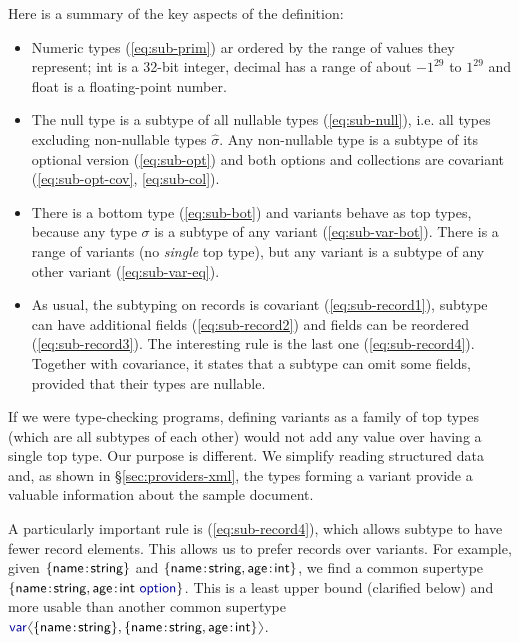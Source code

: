 \documentclass[10pt,preprint,clearpagebib]{sigplanconf}
\newcommand{\langl}{\begin{picture}(4.5,7)
\put(1.1,2.5){\rotatebox{60}{\line(1,0){5.5}}}
\put(1.1,2.5){\rotatebox{300}{\line(1,0){5.5}}}
\end{picture}}
\newcommand{\rangl}{\begin{picture}(4.5,7)
\put(.9,2.5){\rotatebox{120}{\line(1,0){5.5}}}
\put(.9,2.5){\rotatebox{240}{\line(1,0){5.5}}}
\end{picture}}
\newcommand{\kvd}[1]{\textnormal{\textcolor{kvdclr}{\sffamily #1}}}
\newcommand{\ident}[1]{\textnormal{\sffamily #1}}
\begin{document}

\noindent
Here is a summary of the key aspects of the definition:
\begin{itemize}
\item Numeric types (\ref{eq:sub-prim}) ar ordered by the range of values they represent;
  \ident{int} is a 32-bit integer, \ident{decimal} has a range of about $-1^{29}$ to $1^{29}$ and 
  \ident{float} is a floating-point number.

\item The \kvd{null} type is a subtype of all nullable types (\ref{eq:sub-null}), i.e. all 
  types excluding non-nullable types $\hat{\sigma}$. Any non-nullable type is a 
  subtype of its optional version (\ref{eq:sub-opt}) and both options and collections are 
  covariant (\ref{eq:sub-opt-cov}, \ref{eq:sub-col}).

\item There is a bottom type (\ref{eq:sub-bot}) and variants behave as top types, because
  any type $\sigma$ is a subtype of any variant (\ref{eq:sub-var-bot}). There is a range of
  variants (no \emph{single} top type), but any variant is a subtype of any other variant 
  (\ref{eq:sub-var-eq}).

\item As usual, the subtyping on records is covariant (\ref{eq:sub-record1}), subtype can have additional 
  fields (\ref{eq:sub-record2}) and fields can  be reordered (\ref{eq:sub-record3}). The interesting rule 
  is the last one (\ref{eq:sub-record4}).  Together with covariance, it states that a subtype can omit some 
  fields, provided that their types are nullable.
\end{itemize}

\noindent
If we were type-checking programs, defining variants as a family of top types (which are all 
subtypes of each other) would not add any value over having a single top type. Our purpose 
is different. We simplify reading structured data and, as shown in \S\ref{sec:providers-xml}, 
the types forming a variant provide a valuable information about the sample document.

A particularly important rule is (\ref{eq:sub-record4}), which allows subtype to have fewer record 
elements. This allows us to prefer records over variants. For example, given 
$\{ \ident{name}\!:\!\ident{string} \}$ and $\{ \ident{name}\!:\!\ident{string}, \ident{age}\!:\!\ident{int} \}$,
we find a common supertype $\{ \ident{name}\!:\!\ident{string}, \ident{age}\!:\!\ident{int}~\kvd{option} \}$.
This is a least upper bound (clarified below) and more usable than another common supertype 
$\kvd{var}\langl \{ \ident{name}\!:\!\ident{string} \}, \{ \ident{name}\!:\!\ident{string}, \ident{age}\!:\!\ident{int} \}\rangl$.
\end{document}
